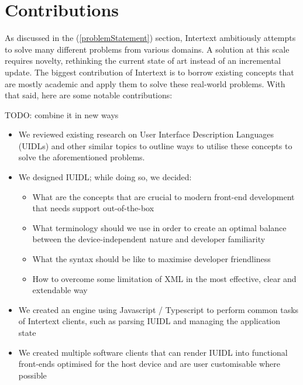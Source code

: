 
\section{Contributions}

As discussed in the  (\ref{problemStatement}) section, Intertext ambitiously attempts to solve many different problems from various domains. A solution at this scale requires novelty, rethinking the current state of art instead of an incremental update. The biggest contribution of Intertext is to borrow existing concepts that are mostly academic and apply them to solve these real-world problems. With that said, here are some notable contributions:

TODO: combine it in new ways

\begin{itemize}
  \item We reviewed existing research on User Interface Description Languages (UIDLs) and other similar topics to outline ways to utilise these concepts to solve the aforementioned problems.
  \item We designed IUIDL; while doing so, we decided:
  \begin{itemize}
    \item What are the concepts that are crucial to modern front-end development that needs support out-of-the-box
    \item What terminology should we use in order to create an optimal balance between the device-independent nature and developer familiarity
    \item What the syntax should be like to maximise developer friendliness
    \item How to overcome some limitation of XML in the most effective, clear and extendable way
  \end{itemize}
  \item We created an engine using Javascript / Typescript to perform common tasks of Intertext clients, such as parsing IUIDL and managing the application state
  \item We created multiple software clients that can render IUIDL into functional front-ends optimised for the host device and are user customisable where possible
\end{itemize}